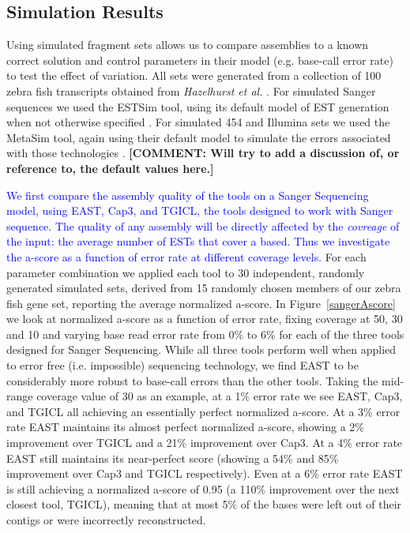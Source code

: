 \documentclass[10pt]{bmc_article}
\newcommand{\capthree} {{\small Cap3}}
\newcommand{\estsim}{{\small ESTSim}}
\newcommand{\metasim} {{\small MetaSim}}
\newcommand{\tgicl} {{\small TGICL}}
\newcommand{\east} {{\small EAST}}
\newenvironment{bmcformat}{\begin{raggedright}\baselineskip20pt\sloppy\setboolean{publ}{false}}{\end{raggedright}\baselineskip20pt\sloppy}
\begin{document}
\begin{bmcformat}
\subsection*{Simulation Results}
Using simulated fragment sets allows us to compare assemblies to
a known correct solution and control parameters in their model
(e.g. base-call error rate) to test the effect of variation.  All sets
were generated from a collection of 100 zebra fish transcripts
obtained from {\it Hazelhurst et al.}  \cite{Hazelhurst08}.  For
simulated Sanger sequences we used the \estsim\/ tool, using its
default model of EST generation when not otherwise specified
\cite{Hazelhurst03}.  For simulated 454 and Illumina sets we used the
\metasim\/ tool, again using their default model to simulate the
errors associated with those technologies \cite{Richter08}. {\bf
  [COMMENT: Will try to add a discussion of, or reference to, the
  default values here.]}

\vspace{3mm}

 \textcolor{blue}{We first compare the
  assembly quality of the tools on a Sanger Sequencing model, using
  \east, \capthree, and \tgicl\/, the tools designed to work with
  Sanger sequence.  The quality of any assembly will be directly
  affected by the {\it covreage} of the input: the average number of
  ESTs that cover a based.  Thus we investigate the a-score as a
  function of error rate at different coverage levels.}  For each
parameter combination we applied each tool to 30 independent, randomly
generated simulated sets, derived from 15 randomly chosen members of
our zebra fish gene set, reporting the average normalized a-score.  In
Figure~\ref{sangerAscore} we look at normalized a-score as a function
of error rate, fixing coverage at 50, 30 and 10 and varying base read
error rate from 0\% to 6\% for each of the three tools designed for
Sanger Sequencing.  While all three tools perform well when applied to
error free (i.e. impossible) sequencing technology, we find \east\/ to
be considerably more robust to base-call errors than the other tools.
Taking the mid-range coverage value of 30 as an example, at a 1\%
error rate we see \east, \capthree, and \tgicl\/ all achieving an
essentially perfect normalized a-score.  At a 3\% error rate \east\/
maintains its almost perfect normalized a-score, showing a 2\%
improvement over \tgicl\/ and a 21\% improvement over \capthree.  At a
4\% error rate \east\/ still maintains its near-perfect score (showing
a 54\% and 85\% improvement over \capthree\/ and \tgicl\/
respectively).  Even at a 6\% error rate \east\/ is still achieving a
normalized a-score of 0.95 (a 110\% improvement over the next closest
tool, \tgicl\/), meaning that at most 5\% of the bases were left out
of their contigs or were incorrectly reconstructed.



\end{bmcformat}
\end{document}

